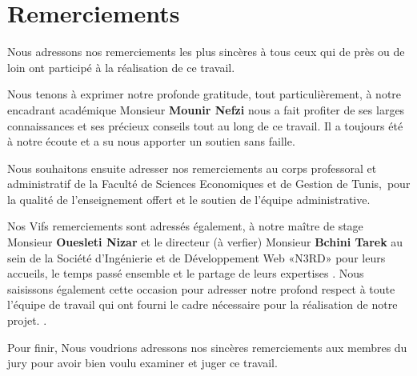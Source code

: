\chapter*{Remerciements}

Nous adressons nos remerciements les plus sincères à  tous ceux qui de près ou de loin ont participé à la réalisation de ce travail. 

\medskip

Nous tenons à exprimer notre profonde gratitude, tout particulièrement,  à notre encadrant académique Monsieur \textbf{Mounir Nefzi} nous a fait profiter de ses larges connaissances et ses précieux conseils tout au long de ce travail. Il a toujours été à notre écoute et a su nous apporter un soutien sans faille.

\medskip


Nous souhaitons ensuite adresser nos remerciements au corps professoral et administratif de la Faculté de Sciences Economiques et de Gestion de Tunis, pour la qualité de l’enseignement offert et le soutien de l’équipe administrative.
\medskip

Nos Vifs remerciements sont adressés également, à notre maître de stage Monsieur \textbf{Ouesleti Nizar} et le directeur (à verfier) Monsieur \textbf{Bchini Tarek}  au sein de la Société d'Ingénierie et de Développement Web «N3RD» pour leurs accueils, le temps passé ensemble et le partage de leurs expertises . 
Nous saisissons également cette occasion pour adresser notre profond respect à toute l'équipe de travail qui ont fourni le cadre nécessaire pour la réalisation de notre projet.
.
\medskip

Pour finir, Nous voudrions adressons nos sincères remerciements aux membres du jury pour avoir bien voulu examiner et juger ce travail. \\[1cm]





\clearpage